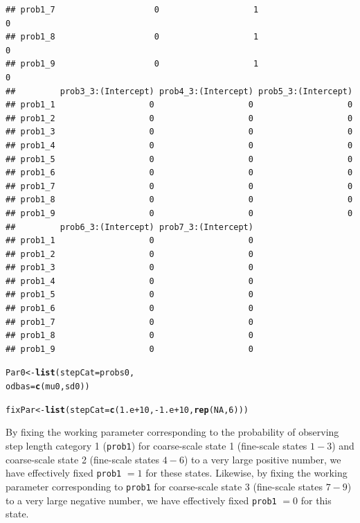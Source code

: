 \documentclass[12pt]{article}\usepackage[]{graphicx}\usepackage[]{xcolor}
\makeatletter
\newcommand{\hlnum}[1]{\textcolor[rgb]{0.686,0.059,0.569}{#1}}%
\newcommand{\hlopt}[1]{\textcolor[rgb]{0,0,0}{#1}}%
\newcommand{\hldef}[1]{\textcolor[rgb]{0.345,0.345,0.345}{#1}}%
\newcommand{\hlkwb}[1]{\textcolor[rgb]{0.69,0.353,0.396}{#1}}%
\newcommand{\hlkwc}[1]{\textcolor[rgb]{0.333,0.667,0.333}{#1}}%
\newcommand{\hlkwd}[1]{\textcolor[rgb]{0.737,0.353,0.396}{\textbf{#1}}}%
\newenvironment{kframe}{%
 \def\at@end@of@kframe{}%
 \ifinner\ifhmode%
  \def\at@end@of@kframe{\end{minipage}}%
  \begin{minipage}{\columnwidth}%
 \fi\fi%
 \def\FrameCommand##1{\hskip\@totalleftmargin \hskip-\fboxsep
 \colorbox{shadecolor}{##1}\hskip-\fboxsep
     \hskip-\linewidth \hskip-\@totalleftmargin \hskip\columnwidth}%
 \MakeFramed {\advance\hsize-\width
   \@totalleftmargin\z@ \linewidth\hsize
   \@setminipage}}%
 {\par\unskip\endMakeFramed%
 \at@end@of@kframe}
\newenvironment{knitrout}{}{} %
\makeatother
\begin{document}
\begin{knitrout}
\begin{kframe}
\begin{verbatim}
## prob1_7                    0                   1                   0
## prob1_8                    0                   1                   0
## prob1_9                    0                   1                   0
##         prob3_3:(Intercept) prob4_3:(Intercept) prob5_3:(Intercept)
## prob1_1                   0                   0                   0
## prob1_2                   0                   0                   0
## prob1_3                   0                   0                   0
## prob1_4                   0                   0                   0
## prob1_5                   0                   0                   0
## prob1_6                   0                   0                   0
## prob1_7                   0                   0                   0
## prob1_8                   0                   0                   0
## prob1_9                   0                   0                   0
##         prob6_3:(Intercept) prob7_3:(Intercept)
## prob1_1                   0                   0
## prob1_2                   0                   0
## prob1_3                   0                   0
## prob1_4                   0                   0
## prob1_5                   0                   0
## prob1_6                   0                   0
## prob1_7                   0                   0
## prob1_8                   0                   0
## prob1_9                   0                   0
\end{verbatim}
\begin{alltt}
\hldef{Par0} \hlkwb{<-} \hlkwd{list}\hldef{(}\hlkwc{stepCat} \hldef{= probs0,}
             \hlkwc{odbas} \hldef{=} \hlkwd{c}\hldef{(mu0,sd0))}

\hldef{fixPar} \hlkwb{<-} \hlkwd{list}\hldef{(}\hlkwc{stepCat}\hldef{=}\hlkwd{c}\hldef{(}\hlnum{1.e+10}\hldef{,}\hlopt{-}\hlnum{1.e+10}\hldef{,}\hlkwd{rep}\hldef{(}\hlnum{NA}\hldef{,}\hlnum{6}\hldef{)))}
\end{alltt}
\end{kframe}
\end{knitrout}
\noindent By fixing the working parameter corresponding to the probability of observing step length category 1 (\verb|prob1|) for coarse-scale state 1 (fine-scale states $1-3$) and coarse-scale state 2 (fine-scale states $4-6$) to a very large positive number, we have effectively fixed \verb|prob1| $=1$ for these states. Likewise, by fixing the working parameter corresponding to \verb|prob1| for coarse-scale state 3 (fine-scale states $7-9$) to a very large negative number, we have effectively fixed \verb|prob1| $=0$ for this state.
\end{document}
